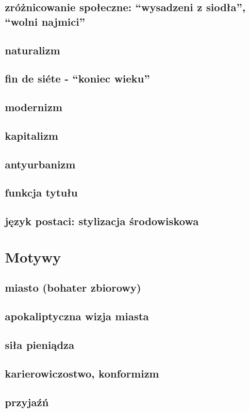 \documentclass[a4paper]{article}
\begin{document}
\subsection{zróżnicowanie społeczne: ``wysadzeni z siodła'', ``wolni najmici''}
\subsection{naturalizm}
\subsection{fin de si\'ete - ``koniec wieku''}
\subsection{modernizm}
\subsection{kapitalizm}
\subsection{antyurbanizm}
\subsection{funkcja tytułu}
\subsection{język postaci: stylizacja środowiskowa}
\section{Motywy}
\subsection{miasto (bohater zbiorowy)}
\subsection{apokaliptyczna wizja miasta}
\subsection{siła pieniądza}
\subsection{karierowiczostwo, konformizm}
\subsection{przyjaźń}
\end{document}
